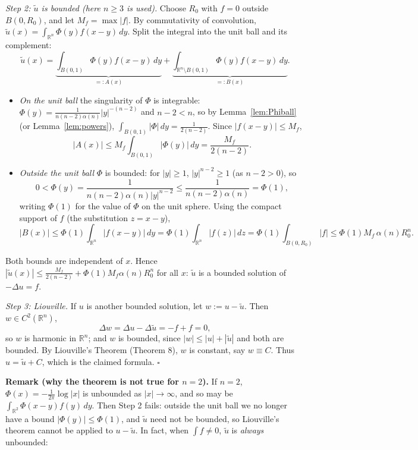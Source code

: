 \documentclass[11pt]{article}
\theoremstyle{plain}
\theoremstyle{definition}
\theoremstyle{remark}
\begin{document}
\emph{Step 2: $\tilde u$ is bounded (here $n \geq 3$ is used).} Choose $R_0$ with $f = 0$ outside $B(0,R_0)$, and let $M_f = \max|f|$. By commutativity of convolution, $\tilde u(x) = \int_{\mathbb{R}^n}\Phi(y)f(x-y)\, dy$. Split the integral into the unit ball and its complement:
$$ \tilde u(x) = \underbrace{\int_{B(0,1)}\Phi(y)f(x-y)\, dy}_{=: A(x)} + \underbrace{\int_{\mathbb{R}^n \setminus B(0,1)}\Phi(y)f(x-y)\, dy}_{=: B(x)}. $$
\begin{itemize}
    \item \emph{On the unit ball} the singularity of $\Phi$ is integrable: $\Phi(y) = \frac{1}{n(n-2)\alpha(n)}|y|^{-(n-2)}$ and $n - 2 < n$, so by Lemma~\ref{lem:Phiball} (or Lemma~\ref{lem:powers}), $\int_{B(0,1)}|\Phi|\, dy = \frac{1}{2(n-2)}$. Since $|f(x - y)| \leq M_f$,
    $$ |A(x)| \leq M_f\int_{B(0,1)}|\Phi(y)|\, dy = \frac{M_f}{2(n-2)}. $$
    \item \emph{Outside the unit ball} $\Phi$ is bounded: for $|y| \geq 1$, $|y|^{n-2} \geq 1$ (as $n - 2 > 0$), so
    $$ 0 < \Phi(y) = \frac{1}{n(n-2)\alpha(n)|y|^{n-2}} \leq \frac{1}{n(n-2)\alpha(n)} = \Phi(1), $$
    writing $\Phi(1)$ for the value of $\Phi$ on the unit sphere. Using the compact support of $f$ (the substitution $z = x - y$),
    $$ |B(x)| \leq \Phi(1)\int_{\mathbb{R}^n}|f(x-y)|\, dy = \Phi(1)\int_{\mathbb{R}^n}|f(z)|\, dz = \Phi(1)\int_{B(0,R_0)}|f| \leq \Phi(1)M_f\,\alpha(n)R_0^n. $$
\end{itemize}
Both bounds are independent of $x$. Hence $|\tilde u(x)| \leq \frac{M_f}{2(n-2)} + \Phi(1)M_f\alpha(n)R_0^n$ for all $x$: $\tilde u$ is a bounded solution of $-\Delta u = f$.

\emph{Step 3: Liouville.} If $u$ is another bounded solution, let $w := u - \tilde u$. Then $w \in C^2(\mathbb{R}^n)$,
$$ \Delta w = \Delta u - \Delta\tilde u = -f + f = 0, $$
so $w$ is harmonic in $\mathbb{R}^n$; and $w$ is bounded, since $|w| \leq |u| + |\tilde u|$ and both are bounded. By Liouville's Theorem (Theorem 8), $w$ is constant, say $w \equiv C$. Thus $u = \tilde u + C$, which is the claimed formula. $\square$

\textbf{Remark (why the theorem is not true for $n = 2$).} If $n = 2$, $\Phi(x) = -\frac{1}{2\pi}\log|x|$ is unbounded as $|x| \to \infty$, and so may be $\int_{\mathbb{R}^2}\Phi(x-y)f(y)\, dy$. Then Step 2 fails: outside the unit ball we no longer have a bound $|\Phi(y)| \leq \Phi(1)$, and $\tilde u$ need not be bounded, so Liouville's theorem cannot be applied to $u - \tilde u$. In fact, when $\int f \neq 0$, $\tilde u$ is \emph{always} unbounded:
\end{document}
